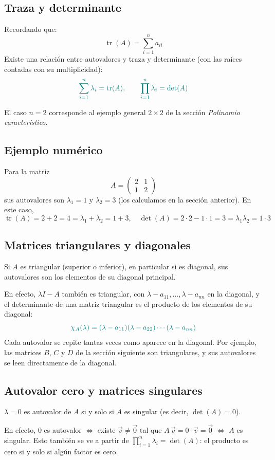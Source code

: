 \documentclass{article}
\newcommand{\vect}[1]{\vec{#1}}
\begin{document}
\subsection*{Traza y determinante}
Recordando que:
\[
\operatorname{tr}(A) = \sum_{i=1}^n a_{ii}
\]
Existe una relación entre autovalores y traza y determinante (con las raíces contadas con su multiplicidad):
\[\color{teal}
\sum_{i=1}^n \lambda_i = \operatorname{tr}(A),
\qquad
\prod_{i=1}^n \lambda_i = \det(A)
\]

El caso \(n=2\) corresponde al ejemplo general \(2\times2\) de la sección \emph{Polinomio característico}.

\subsection*{Ejemplo numérico}
Para la matriz
\[
A = \begin{pmatrix}2 & 1\\1 & 2\end{pmatrix}
\]
sus autovalores son \(\lambda_1=1\) y \(\lambda_2=3\) (los calculamos en la sección anterior). En este caso,
\[
\operatorname{tr}(A)=2+2=4=\lambda_1+\lambda_2=1+3,
\quad
\det(A)=2\cdot2-1\cdot1=3=\lambda_1\lambda_2=1\cdot3
\]

\subsection*{Matrices triangulares y diagonales}
Si \(A\) es triangular (superior o inferior), en particular si es diagonal, sus autovalores son los elementos de su diagonal principal.

En efecto, \(\lambda I-A\) también es triangular, con \(\lambda-a_{11},\dots,\lambda-a_{nn}\) en la diagonal, y el determinante de una matriz triangular es el producto de los elementos de su diagonal:
\[\color{teal}
\chi_A(\lambda)=(\lambda-a_{11})(\lambda-a_{22})\cdots(\lambda-a_{nn})
\]
Cada autovalor se repite tantas veces como aparece en la diagonal. Por ejemplo, las matrices \(B\), \(C\) y \(D\) de la sección siguiente son triangulares, y sus autovalores se leen directamente de la diagonal.

\subsection*{Autovalor cero y matrices singulares}
\(\lambda=0\) es autovalor de \(A\) si y solo si \(A\) es singular (es decir, \(\det(A)=0\)).

En efecto, \(0\) es autovalor \(\Leftrightarrow\) existe \(\vect{v}\neq\vect{0}\) tal que \(A\,\vect{v}=0\cdot\vect{v}=\vect{0}\) \(\Leftrightarrow\) \(A\) es singular. Esto también se ve a partir de \(\prod_{i=1}^n \lambda_i=\det(A)\): el producto es cero si y solo si algún factor es cero.
\end{document}
